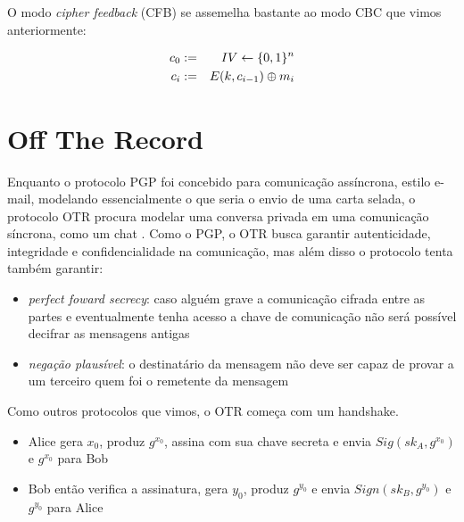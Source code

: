 O modo {\em cipher feedback} (CFB) se assemelha bastante ao modo CBC que vimos anteriormente:

\begin{eqnarray*}
  c_0 & := & IV \leftarrow \{0,1\}^n\\
  c_i & := & E(k, c_{i-1}) \oplus m_i
\end{eqnarray*}


\section{Off The Record}
\label{sec:otr}

Enquanto o protocolo PGP foi concebido para comunicação assíncrona, estilo e-mail, modelando essencialmente o que seria o envio de uma carta selada, o protocolo OTR procura modelar uma conversa privada em uma comunicação síncrona, como um chat \cite{Borisov04}.
Como o PGP, o OTR busca garantir autenticidade, integridade e confidencialidade na comunicação, mas além disso o protocolo tenta também garantir:
\begin{itemize}
\item {\em perfect foward secrecy}: caso alguém grave a comunicação cifrada entre as partes e eventualmente tenha acesso a chave de comunicação não será possível decifrar as mensagens antigas
\item {\em negação plausível}: o destinatário da mensagem não deve ser capaz de provar a um terceiro quem foi o remetente da mensagem
\end{itemize}

Como outros protocolos que vimos, o OTR começa com um handshake.
\begin{itemize}
\item Alice gera $x_0$, produz $g^{x_0}$, assina com sua chave secreta e envia $Sig(sk_A, g^{x_0})$ e $g^{x_0}$ para Bob
\item Bob então verifica a assinatura, gera $y_0$, produz $g^{y_0}$ e envia $Sign(sk_B, g^{y_0})$ e $g^{y_0}$ para Alice
\end{itemize}

